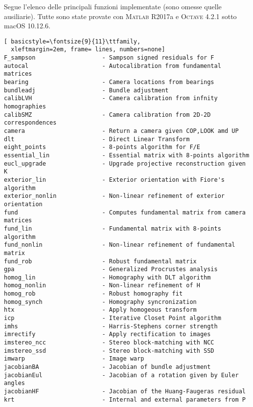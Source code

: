 \enlargethispage{1mm}
\noindent
Segue l'elenco delle principali funzioni implementate (sono omesse
quelle ausiliarie). Tutte sono state provate con \textsc{Matlab}
R2017a e \textsc{Octave} 4.2.1 sotto macOS 10.12.6.

\bigskip

\begin{adjustbox}{width=\textwidth,keepaspectratio}      
  \begin{lstlisting}[ basicstyle=\fontsize{9}{11}\ttfamily,
  xleftmargin=2em, frame= lines, numbers=none]
F_sampson                   - Sampson signed residuals for F
autocal                     - Autocalibration from fundamental matrices
bearing                     - Camera locations from bearings
bundleadj                   - Bundle adjustment
calibLVH                    - Camera calibration from infnity homographies
calibSMZ                    - Camera calibration from 2D-2D correspondences
camera                      - Return a camera given COP,LOOK amd UP
dlt                         - Direct Linear Transform
eight_points                - 8-points algorithm for F/E
essential_lin               - Essential matrix with 8-points algorithm
eucl_upgrade                - Upgrade projective reconstruction given K
exterior_lin                - Exterior orientation with Fiore's algorithm
exterior_nonlin             - Non-linear refinement of exterior orientation
fund                        - Computes fundamental matrix from camera matrices
fund_lin                    - Fundamental matrix with 8-points algorithm
fund_nonlin                 - Non-linear refinement of fundamental matrix
fund_rob                    - Robust fundamental matrix 
gpa                         - Generalized Procrustes analysis
homog_lin                   - Homography with DLT algorithm
homog_nonlin                - Non-linear refinement of H
homog_rob                   - Robust homography fit
homog_synch                 - Homography syncronization
htx                         - Apply homogeous transform
icp                         - Iterative Closet Point algorithm 
imhs                        - Harris-Stephens corner strength
imrectify                   - Apply rectification to images
imstereo_ncc                - Stereo block-matching with NCC
imstereo_ssd                - Stereo block-matching with SSD
imwarp                      - Image warp
jacobianBA                  - Jacobian of bundle adjustment
jacobianEul                 - Jacobian of a rotation given by Euler angles
jacobianHF                  - Jacobian of the Huang-Faugeras residual
krt                         - Internal and external parameters from P

\end{lstlisting}
\end{adjustbox}
